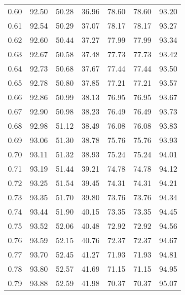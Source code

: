 \begin{tabular}{|c|c|c|c|c|c|c|}
      0.60 &     92.50 &     50.28 &      36.96 &   78.60 &      78.60 &         93.20 \\
      0.61 &     92.54 &     50.29 &      37.07 &   78.17 &      78.17 &         93.27 \\
      0.62 &     92.60 &     50.44 &      37.27 &   77.99 &      77.99 &         93.34 \\
      0.63 &     92.67 &     50.58 &      37.48 &   77.73 &      77.73 &         93.42 \\
      0.64 &     92.73 &     50.68 &      37.67 &   77.44 &      77.44 &         93.50 \\
      0.65 &     92.78 &     50.80 &      37.85 &   77.21 &      77.21 &         93.57 \\
      0.66 &     92.86 &     50.99 &      38.13 &   76.95 &      76.95 &         93.67 \\
      0.67 &     92.90 &     50.98 &      38.23 &   76.49 &      76.49 &         93.73 \\
      0.68 &     92.98 &     51.12 &      38.49 &   76.08 &      76.08 &         93.83 \\
      0.69 &     93.06 &     51.30 &      38.78 &   75.76 &      75.76 &         93.93 \\
      0.70 &     93.11 &     51.32 &      38.93 &   75.24 &      75.24 &         94.01 \\
      0.71 &     93.19 &     51.44 &      39.21 &   74.78 &      74.78 &         94.12 \\
      0.72 &     93.25 &     51.54 &      39.45 &   74.31 &      74.31 &         94.21 \\
      0.73 &     93.35 &     51.70 &      39.80 &   73.76 &      73.76 &         94.34 \\
      0.74 &     93.44 &     51.90 &      40.15 &   73.35 &      73.35 &         94.45 \\
      0.75 &     93.52 &     52.06 &      40.48 &   72.92 &      72.92 &         94.56 \\
      0.76 &     93.59 &     52.15 &      40.76 &   72.37 &      72.37 &         94.67 \\
      0.77 &     93.70 &     52.45 &      41.27 &   71.93 &      71.93 &         94.81 \\
      0.78 &     93.80 &     52.57 &      41.69 &   71.15 &      71.15 &         94.95 \\
      0.79 &     93.88 &     52.59 &      41.98 &   70.37 &      70.37 &         95.07 \\

\end{tabular}
